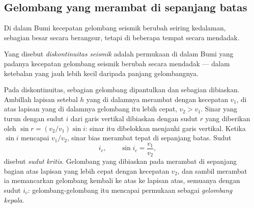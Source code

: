 \subsection{Gelombang yang merambat di sepanjang batas}

Di dalam Bumi kecepatan gelombang seismik berubah seiring kedalaman, sebagian
besar secara berangsur, tetapi di beberapa tempat secara mendadak.

\begin{definition}\label{def:g11:seismic-structure:discontinuity}
Yang disebut \emph{diskontinuitas seismik} adalah
permukaan di dalam Bumi yang padanya kecepatan gelombang seismik berubah secara
mendadak --- dalam ketebalan yang jauh lebih kecil daripada panjang gelombangnya.
\end{definition}

Pada diskontinuitas, sebagian gelombang dipantulkan dan sebagian dibiaskan.
Ambillah lapisan setebal $h$ yang di dalamnya  merambat dengan
kecepatan $v_1$, di atas lapisan yang di dalamnya gelombang itu lebih cepat,
$v_2 > v_1$. Sinar yang turun dengan sudut $i$ dari garis vertikal dibiaskan
dengan sudut $r$ yang diberikan oleh $\sin r = (v_2/v_1)\sin
i$: sinar itu dibelokkan menjauhi garis vertikal. Ketika $\sin i$ mencapai
$v_1/v_2$, sinar bias merambat tepat di sepanjang batas. Sudut
\[
  i_c, \qquad \sin i_c = \frac{v_1}{v_2},
\]
disebut \emph{sudut kritis}. Gelombang yang dibiaskan pada
 merambat di sepanjang bagian atas lapisan yang lebih cepat dengan
kecepatan $v_2$, dan sambil merambat ia memancarkan gelombang kembali ke atas ke
lapisan atas, semuanya dengan sudut $i_c$: gelombang-gelombang itu mencapai
permukaan sebagai \emph{gelombang kepala}.

